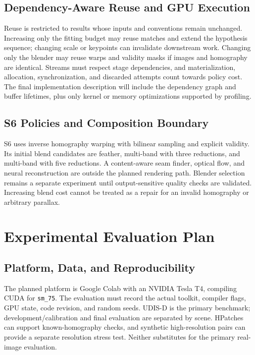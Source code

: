 \documentclass[a4paper,UKenglish,cleveref,autoref,anonymous]{oasics-v2021}
\begin{document}
\subsection{Dependency-Aware Reuse and GPU Execution}
Reuse is restricted to results whose inputs and conventions remain unchanged.
Increasing only the fitting budget may reuse matches and extend the hypothesis
sequence; changing scale or keypoints can invalidate downstream work. Changing
only the blender may reuse warps and validity masks if images and homography
are identical. Streams must respect stage dependencies, and materialization,
allocation, synchronization, and discarded attempts count towards policy cost.
The final implementation description will include the dependency graph and
buffer lifetimes, plus only kernel or memory optimizations supported by profiling.

\subsection{S6 Policies and Composition Boundary}
S6 uses inverse homography warping with bilinear sampling and explicit validity.
Its initial blend candidates are feather, multi-band with three reductions, and
multi-band with five reductions. A content-aware seam finder, optical flow,
and neural reconstruction are outside the planned rendering path. Blender
selection remains a separate experiment until output-sensitive quality checks
are validated. Increasing blend cost cannot be treated as a repair for an
invalid homography or arbitrary parallax.

\section{Experimental Evaluation Plan}
\label{sec:evaluation}
\subsection{Platform, Data, and Reproducibility}
The planned platform is Google Colab with an NVIDIA Tesla T4, compiling CUDA
for \texttt{sm\_75}. The evaluation must record the actual toolkit, compiler flags,
GPU state, code revision, and random seeds. UDIS-D is the primary benchmark;
development/calibration and final evaluation are separated by scene. HPatches
can support known-homography checks, and synthetic high-resolution pairs can
provide a separate resolution stress test. Neither substitutes for the primary
real-image evaluation.
\end{document}
